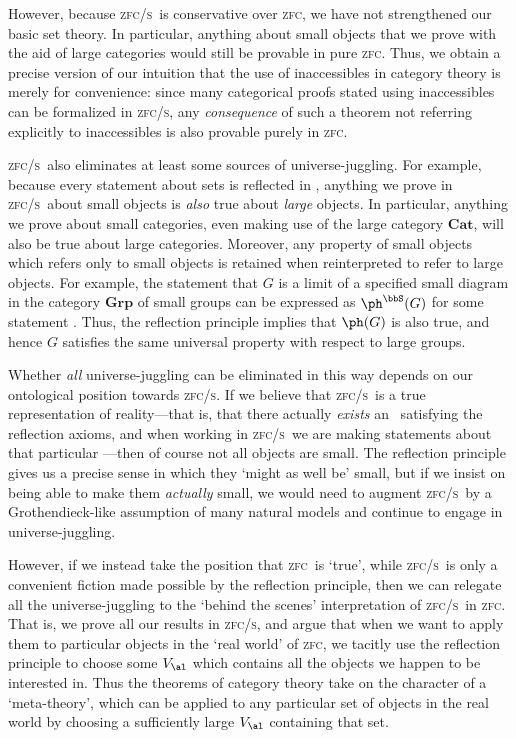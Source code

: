 \documentclass{amsart}
\def\zfc{\textsc{zfc}}
\def\zfcs{\textsc{zfc/s}}
\begin{document}
However, because \zfcs\ is conservative over \zfc, we have not
strengthened our basic set theory.  In particular, anything about
small objects that we prove with the aid of large categories would
still be provable in pure \zfc.  Thus, we obtain a precise version of
our intuition that the use of inaccessibles in category theory is
merely for convenience: since many categorical proofs stated using
inaccessibles can be formalized in \zfcs, any \emph{consequence} of
such a theorem not referring explicitly to inaccessibles is also
provable purely in \zfc.

\zfcs\ also eliminates at least some sources of universe-juggling.
For example, because every statement about sets is reflected in \bbS,
anything we prove in \zfcs\ about small objects is \emph{also} true
about \emph{large} objects.  In particular, anything we prove about
small categories, even making use of the large category
$\mathbf{Cat}$, will also be true about large categories.  Moreover,
any property of small objects which refers only to small objects is
retained when reinterpreted to refer to large objects.  For example,
the statement that $G$ is a limit of a specified small diagram in the
category $\mathbf{Grp}$ of small groups can be expressed as
$\ph^\bbS(G)$ for some statement \ph.  Thus, the reflection principle
implies that $\ph(G)$ is also true, and hence $G$ satisfies the same
universal property with respect to large groups.

Whether \emph{all} universe-juggling can be eliminated in this way
depends on our ontological position towards \zfcs.  If we believe that
\zfcs\ is a true representation of reality---that is, that there
actually \emph{exists} an \bbS\ satisfying the reflection axioms, and
when working in \zfcs\ we are making statements about that particular
\bbS---then of course not all objects are small.  The reflection
principle gives us a precise sense in which they `might as well be'
small, but if we insist on being able to make them \emph{actually}
small, we would need to augment \zfcs\ by a Grothendieck-like
assumption of many natural models and continue to engage in
universe-juggling.

However, if we instead take the position that \zfc\ is `true', while
\zfcs\ is only a convenient fiction made possible by the reflection
principle, then we can relegate all the universe-juggling to the
`behind the scenes' interpretation of \zfcs\ in \zfc.  That is, we
prove all our results in \zfcs, and argue that when we want to apply
them to particular objects in the `real world' of \zfc, we tacitly use
the reflection principle to choose some $V_\al$ which contains all the
objects we happen to be interested in.  Thus the theorems of category
theory take on the character of a `meta-theory', which can be applied
to any particular set of objects in the real world by choosing a
sufficiently large $V_\al$ containing that set.
\end{document}
